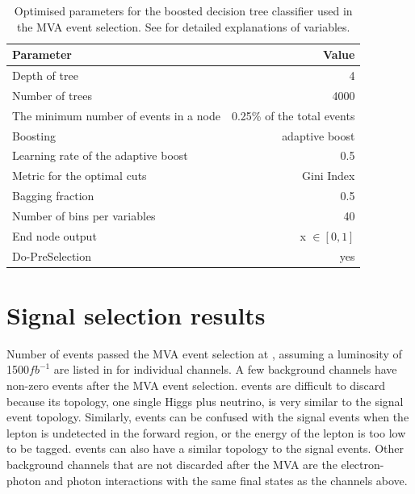 \begin{table}[!tbp]\centering

\begin{tabular}{lr}
\hline \hline
 Parameter &  Value \\
\hline
Depth of tree & 4 \\
Number of trees & 4000 \\
The minimum number of events in a node &  0.25\% of the total events \\
Boosting & adaptive boost \\
Learning rate of the adaptive boost & 0.5 \\
Metric for the optimal cuts & Gini Index \\
Bagging fraction & 0.5 \\
Number of bins per variables & 40 \\
End node output & x $\in [0,1]$ \\
Do-PreSelection & yes \\
\hline \hline
\end{tabular}

\caption
{Optimised parameters for the boosted decision tree classifier used in the MVA event selection. See  for detailed explanations of variables.}
\label{tab:doubleHiggsBDTparameters}
\end{table}

\section{Signal selection results}
\label{sec:doubleHiggsSignalSelResult}

Number of events passed the MVA event selection at , assuming a luminosity of 1500$fb^{-1}$  are listed in  for individual channels. A few  background channels have non-zero events after the MVA event selection. \eeTo{\Pquark \APquark \PHiggs \Pnu \APnu} events are difficult to discard because its topology, one single Higgs plus neutrino, is very similar to the signal event topology. Similarly, \eeTo{ \Pquark \Pquark \Pquark \Pquark \Plepton \Pnu} events can be confused with the signal events when the lepton is undetected in the forward region, or the energy of the lepton is too low to be tagged. \eeTo{ \Pquark \Pquark \Pquark \Pquark \Pnu \APnu} events can also have a similar topology to the signal events. Other background channels that are not discarded after the MVA are the electron-photon and photon interactions with the same final states as the channels above.


